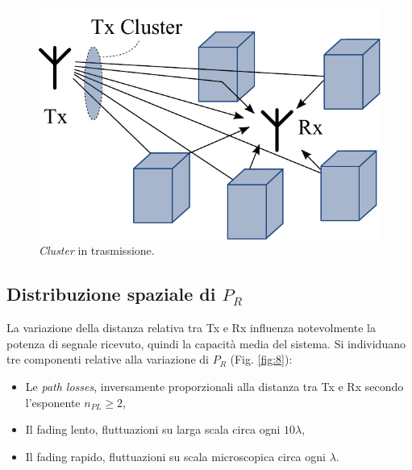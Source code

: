\documentclass[technote]{IEEEtran}
\begin{document}
\begin{figure}[!ht]
\centering
\includegraphics[width=.55\columnwidth]{figure7}
\caption{\textit{Cluster} in trasmissione.}
\label{fig:7}
\end{figure}

\subsection{Distribuzione spaziale di $P_R$}

La variazione della distanza relativa tra Tx e Rx influenza notevolmente la potenza di segnale ricevuto, quindi la capacità  media del sistema. Si individuano tre componenti relative alla variazione di $P_R$ (Fig. \ref{fig:8}):
\begin{itemize}
\item Le \textit{path losses}, inversamente proporzionali alla distanza tra Tx e Rx secondo l'esponente ${n_{PL}} \ge 2$,
\item Il {fading} lento, fluttuazioni su larga scala circa ogni $10 \lambda$,
\item Il {fading} rapido, fluttuazioni su scala microscopica circa ogni $\lambda$.
\end{itemize}
\end{document}
